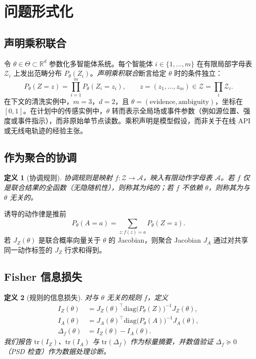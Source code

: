 \documentclass[11pt,a4paper]{article}
\newtheorem{definition}{定义}
\begin{document}
\section{问题形式化}
\label{sec:problem}

\subsection{声明乘积联合}

令 $\theta\in\Theta\subset\mathbb{R}^d$ 参数化多智能体系统。每个智能体 $i\in\{1,\ldots,m\}$ 在有限局部字母表 $\mathcal{Z}_i$ 上发出范畴分布 $P_\theta(Z_i)$。\emph{声明乘积联合}断言给定 $\theta$ 时的条件独立：
\begin{equation}
  P_\theta(Z=z)=\prod_{i=1}^{m} P_\theta(Z_i=z_i),
  \qquad z=(z_1,\ldots,z_m)\in\mathcal{Z}=\prod_i\mathcal{Z}_i.
\end{equation}
在下文的清洗实例中，$m=3$，$d=2$，且 $\theta=(\mathrm{evidence},\mathrm{ambiguity})$，坐标在 $[0,1]$。在计划中的传感实例中，$\theta$ 转而表示全局场或事件参数（例如源位置、强度或事件指示），而非原始单节点读数。乘积声明是模型假设，而非关于在线 API 或无线电轨迹的经验主张。

\subsection{作为聚合的协调}

\begin{definition}[协调规则]
协调规则是映射 $f:\mathcal{Z}\to\mathcal{A}$，映入有限动作字母表 $\mathcal{A}$。若 $f$ 仅是联合结果的全函数（无隐随机性），则称其为\emph{纯}的；若 $f$ 不依赖 $\theta$，则称其为\emph{与 $\theta$ 无关}的。
\end{definition}

诱导的动作律是推前
\begin{equation}
  P_\theta(A=a)=\sum_{z:f(z)=a} P_\theta(Z=z).
\end{equation}
若 $J_Z(\theta)$ 是联合概率向量关于 $\theta$ 的 Jacobian，则聚合 Jacobian $J_A$ 通过对共享同一动作标签的 $J_Z$ 行求和得到。

\subsection{Fisher 信息损失}

\begin{definition}[规则的信息损失]
对与 $\theta$ 无关的规则 $f$，定义
\begin{align}
  I_Z(\theta) &= J_Z(\theta)^\top \mathrm{diag}\bigl(P_\theta(Z)\bigr)^{-1} J_Z(\theta),\\
  I_A(\theta) &= J_A(\theta)^\top \mathrm{diag}\bigl(P_\theta(A)\bigr)^{-1} J_A(\theta),\\
  \Delta_f(\theta) &= I_Z(\theta)-I_A(\theta).
\end{align}
我们报告 $\mathrm{tr}(I_Z)$、$\mathrm{tr}(I_A)$ 与 $\mathrm{tr}(\Delta_f)$ 作为标量摘要，并数值验证 $\Delta_f\succeq 0$（PSD 检查）作为数据处理诊断。
\end{definition}
\end{document}
